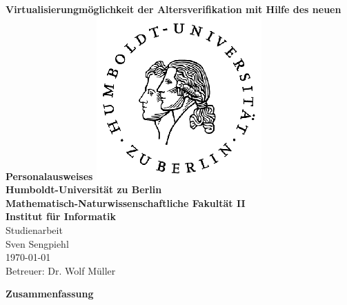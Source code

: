 \documentclass[toc=flat,fontsize=11pt,a4paper,titlepage,headsepline,numbers=noenddot, bibliography=totoc]{scrartcl}
\author{Sven Sengpiehl}
\def\bf{\normalfont\bfseries}
\begin{document}
\thispagestyle{empty}

\hspace{20cm}
\vspace{-2cm}

\begin{center}
  \vspace{0.5 cm}
  \huge{\bf Virtualisierungmöglichkeit der Altersverifikation mit Hilfe des neuen Personalausweises \linebreak\linebreak \includegraphics[width=6 cm]{HU_Logo}} \\
  \vspace{1.5cm}
  {\large
    \bf{
      Humboldt-Universit\"at zu Berlin \\
      Mathematisch-Naturwissenschaftliche Fakult\"at II \\
      Institut f\"ur Informatik\\
    }
  } 
  \vspace{1cm}
  \LARGE Studienarbeit \\
  \vspace{2cm}
  \normalsize
      Sven Sengpiehl\\
    \vspace{0.5cm}
      \today\\
\vspace{1cm}
    Betreuer:
    \vspace{0.5cm}
    Dr. Wolf Müller \\
\end{center}
\vspace {5 cm}%

\newpage
\thispagestyle{empty}
\LARGE
\begin{center}


\bf{ Zusammenfassung}
\end{center}
\normalsize
\noindent
\end{document}
